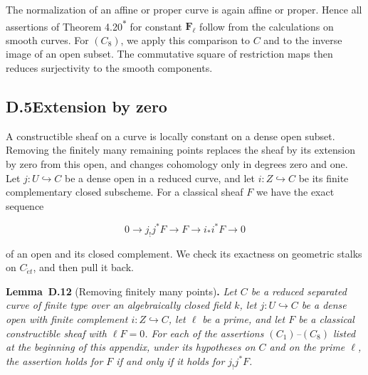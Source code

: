 \documentclass[11pt]{article}
\newenvironment{bpstatement}[2]{\par\addvspace{0.6\baselineskip}\noindent\textbf{#1}#2\textbf{.}\enspace\ignorespaces}
  {\par\addvspace{0.4\baselineskip}}
\newenvironment{bpstatementit}[2]{\begin{bpstatement}{#1}{#2}\itshape\ignorespaces}{\end{bpstatement}}
\newcommand{\bpout}[1]{#1\textsuperscript{\hyperlink{bp-outside}{\ensuremath{\ast}}}}
\begin{document}
The normalization of an affine or proper curve is again affine or proper. Hence all assertions of Theorem \bpout{4.20} for constant \(\mathbf F_\ell\) follow from the calculations on smooth curves. For \((C_8)\), we apply this comparison to \(C\) and to the inverse image of an open subset. The commutative square of restriction maps then reduces surjectivity to the smooth components.


\subsection*{\texorpdfstring{D.5\quad Extension by zero}{D.5 Extension by zero}}
\label{bp210}%
\label{bp211}%
A constructible sheaf on a curve is locally constant on a dense open subset. Removing the finitely many remaining points replaces the sheaf by its extension by zero from this open, and changes cohomology only in degrees zero and one. Let \(j:U\hookrightarrow C\) be a dense open in a reduced curve, and let \(i:Z\hookrightarrow C\) be its finite complementary closed subscheme. For a classical sheaf \(F\) we have the exact sequence

\[
0\longrightarrow j_!j^*F\longrightarrow F
\longrightarrow i_*i^*F\longrightarrow0
\]

of an open and its closed complement. We check its exactness on geometric stalks on \(C_{\acute{e}t}\), and then pull it back.

\label{bp212}%
\begin{bpstatementit}{Lemma~D.12}{ (Removing finitely many points)}
Let \(C\) be a reduced separated curve of finite type over an algebraically closed field \(k\), let \(j:U\hookrightarrow C\) be a dense open with finite complement \(i:Z\hookrightarrow C\), let \(\ell\) be a prime, and let \(F\) be a classical constructible sheaf with \(\ell F=0\). For each of the assertions \((C_1)\)–\((C_8)\) listed at the beginning of this appendix, under its hypotheses on \(C\) and on the prime \(\ell\), the assertion holds for \(F\) if and only if it holds for \(j_!j^*F\).
\end{bpstatementit}
\end{document}
